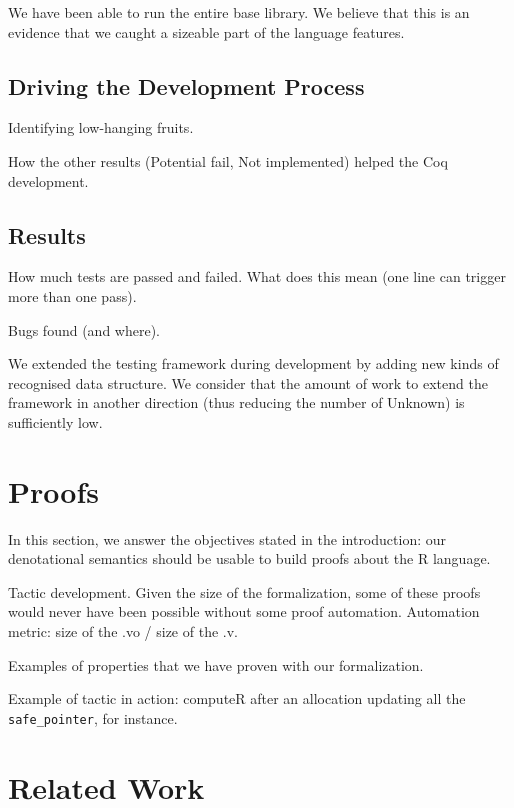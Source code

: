 \documentclass[
    sigplan,
    10pt,
    review, %
    natbib=false %
 ]{acmart}
\begin{document}
We have been able to run the entire base library.
We believe that this is an evidence that we caught a sizeable
part of the language features.


\subsection{Driving the Development Process}
\label{sec:driving:development}

\todo{}

Identifying low-hanging fruits.

How the other results (Potential fail, Not implemented) helped the Coq development.

\subsection{Results}
\label{sec:test:results}

\todo{}

How much tests are passed and failed.
What does this mean (one line can trigger more than one pass).

Bugs found (and where).

We extended the testing framework during development by adding new kinds of recognised
data structure.
We consider that the amount of work to extend the framework in another direction
(thus reducing the number of Unknown) is sufficiently low.

\section{Proofs}
\label{sec:proofs}

In this section,
we answer the objectives stated in the introduction:
our denotational semantics should be usable to build proofs about the R language.

\todo{}

Tactic development.
Given the size of the formalization, some of these proofs would never have been possible
without some proof automation.
Automation metric: size of the .vo / size of the .v.

Examples of properties that we have proven with our formalization.

Example of tactic in action:
computeR after an allocation updating all the \texttt{safe_pointer}, for instance.

\section{Related Work}
\label{sec:related:work}
\end{document}
